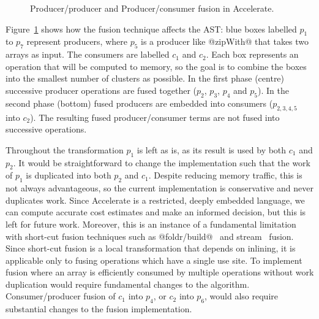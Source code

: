 \begin{figure}[htb]
    \caption[Fusion in Accelerate]{Producer/producer and Producer/consumer fusion in Accelerate.}
    \label{fig:fusion}
\end{figure}

Figure~\ref{fig:fusion} shows how the fusion technique affects the
AST: blue boxes labelled $p_1$ to $p_7$ represent
producers, where $p_5$ is a producer like @zipWith@ that takes two arrays as
input. The consumers are labelled $c_1$ and $c_2$. Each box represents an
operation that will be computed to memory, so the goal is to combine the boxes
into the smallest number of clusters as possible.
In the first phase (centre) successive producer operations are fused together
($p_2$, $p_3$, $p_4$ and $p_5$). In the second phase (bottom) fused producers
are embedded into consumers ($p_{2,3,4,5}$ into $ c_2$). The resulting fused
producer/consumer terms are not fused into successive operations.

Throughout the transformation $p_1$ is left as is, as its result is used by both
$c_1$ and $p_2$. It would be straightforward to change the implementation such
that the work of $p_1$ is duplicated into both $p_2$ and $c_1$. Despite reducing
memory traffic, this is not always advantageous, so the current implementation
is conservative and never duplicates work. Since Accelerate is a restricted,
deeply embedded language, we can compute accurate cost estimates and make an
informed decision, but this is left for future work. Moreover, this is an
instance of a fundamental limitation with short-cut
fusion techniques such as
@foldr/build@~\cite{Gill:1993de} and
stream~\cite{Coutts:2007kp} fusion. Since short-cut fusion
is a local transformation that depends on inlining, it is applicable only to
fusing operations which have a single use site. To implement fusion where an
array is efficiently consumed by multiple operations without work duplication
would require fundamental changes to the algorithm.
%
Consumer/producer fusion of $c_1$ into $p_4$, or $c_2$ into $p_6$, would also
require substantial changes to the fusion implementation.


